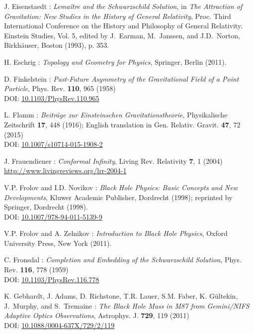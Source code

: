 \begin{thebibliography}{123}
J. Eisenstaedt : {\em Lemaître and the Schwarzschild Solution}, in
{\em The Attraction of Gravitation: New Studies in the History of
General Relativity}, Proc. Third International Conference on the History and Philosophy of General Relativity. Einstein
Studies, Vol. 5, edited by J.~Earman, M.~Janssen, and J.D.~Norton,
Birkhäuser, Boston (1993), p. 353.

H. Eschrig : {\em Topology and Geometry for Physics},
Springer, Berlin (2011).

D. Finkelstein :
{\em Past-Future Asymmetry of the Gravitational Field of a Point Particle},
Phys. Rev. {\bf 110}, 965 (1958)\\
DOI: \href{https://doi.org/10.1103/PhysRev.110.965}{10.1103/PhysRev.110.965}

L. Flamm : {\em Beiträge zur Einsteinschen Gravitationstheorie},
Physikalische Zeitschrift {\bf 17}, 448 (1916); English translation in
Gen. Relativ. Gravit. {\bf 47}, 72 (2015)\\
DOI: \href{https://doi.org/10.1007/s10714-015-1908-2}{10.1007/s10714-015-1908-2}

J. Frauendiener :
{\em Conformal Infinity},
Living Rev. Relativity {\bf 7}, 1 (2004) \\
\url{http://www.livingreviews.org/lrr-2004-1}

V.P. Frolov and I.D. Novikov : {\em Black Hole Physics:
Basic Concepts and New Developments},
Kluwer Academic Publisher, Dordrecht (1998); reprinted by
Springer, Dordrecht (1998). \\
DOI: \href{https://doi.org/10.1007/978-94-011-5139-9}{10.1007/978-94-011-5139-9}

V.P. Frolov and A. Zelnikov : {\em Introduction to Black Hole Physics},
Oxford University Press, New York (2011).

C. Fronsdal : {\em Completion and Embedding of the Schwarzschild Solution},
Phys. Rev. {\bf 116}, 778 (1959) \\
DOI: \href{https://doi.org/10.1103/PhysRev.116.778}{10.1103/PhysRev.116.778}

K. Gebhardt, J. Adams, D. Richstone, T.R. Lauer, S.M. Faber, K. Gültekin, J.~Murphy, and S.~Tremaine :
{\em The Black Hole Mass in M87 from Gemini/NIFS Adaptive Optics Observations},
Astrophys. J. {\bf 729}, 119 (2011)\\
DOI: \href{https://doi.org/10.1088/0004-637X/729/2/119}{10.1088/0004-637X/729/2/119}


\end{thebibliography}
